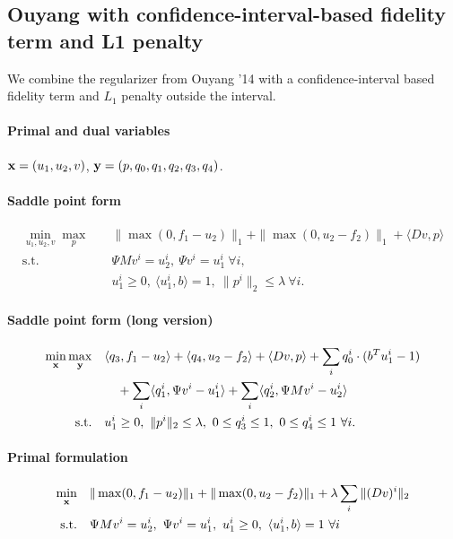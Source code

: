 
\subsection{Ouyang with confidence-interval-based fidelity term and L1 penalty}

We combine the regularizer from Ouyang '14 with a confidence-interval based
fidelity term and $L_1$ penalty outside the interval.

\paragraph{Primal and dual variables}
$\mathbf{x} = (u_1,u_2,v)$, $\mathbf{y} = (p,q_0,q_1,q_2,q_3,q_4)$.

\paragraph{Saddle point form}
\begin{align*}
    \min_{u_1,u_2,v} \max_{p} \quad
        & \|\max(0, f_1 - u_2)\|_1 + \|\max(0, u_2 - f_2)\|_1 + \langle Dv, p \rangle \\
    \text{s.t.}\quad
        & \Psi M v^i = u_2^i, ~\Psi v^i = u_1^i ~\forall i, \\
        & u_1^i \geq 0, ~\langle u_1^i, b \rangle = 1,
          ~\|p^{i}\|_{2} \leq \lambda ~\forall i.
\end{align*}

\paragraph{Saddle point form (long version)}
\begin{align*}
    \min_{\mathbf{x}} \max_{\mathbf{y}} \quad
        & \langle q_3, f_1 - u_2 \rangle + \langle q_4, u_2 - f_2 \rangle
            + \langle Dv, p \rangle
            + \sum_{i} q_0^i \cdot (b^T u_1^i - 1) \\
        &\quad + \sum_{i} \langle q_1^i, \Psi v^i - u_1^i \rangle
            + \sum_{i} \langle q_2^i, \Psi M v^i - u_2^i \rangle \\
    \text{s.t.}\quad
        & u_1^i \geq 0, ~\|p^{i}\|_{2} \leq \lambda,
          ~0 \leq q_3^i \leq 1, ~0 \leq q_4^i \leq 1 ~\forall i.
\end{align*}

\paragraph{Primal formulation}
\begin{align*}
    \min_{\mathbf{x}} \quad
        & \|\max(0, f_1 - u_2)\|_1 + \|\max(0, u_2 - f_2)\|_1
            + \lambda \sum_{i} \| (D v)^{i} \|_{2} \\
    \text{s.t.}\quad
        & \Psi M v^i = u_2^i, ~\Psi v^i = u_1^i,
          ~u_1^i \geq 0, ~\langle u_1^i, b \rangle = 1 ~\forall i
\end{align*}

